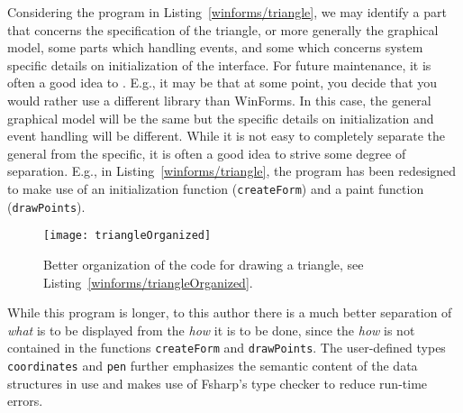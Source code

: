 Considering the program in Listing~\ref{winforms/triangle}, we may identify a part that concerns the specification of the triangle, or more generally the graphical model, some parts which handling events, and some which concerns system specific details on initialization of the interface. For future maintenance, it is often a good idea to . E.g., it may be that at some point, you decide that you would rather use a different library than WinForms. In this case, the general graphical model will be the same but the specific details on initialization and event handling will be different. While it is not easy to completely separate the general from the specific, it is often a good idea to strive some degree of separation. E.g., in Listing~\ref{winforms/triangle}, the program has been redesigned to make use of an initialization function (\lstinline{createForm}) and a paint function (\lstinline{drawPoints}).
%
%
\begin{figure}
  \centering
  \texttt{[image: triangleOrganized]}
  \caption{Better organization of the code for drawing a triangle, see Listing~\ref{winforms/triangleOrganized}.}
  \label{fig:triangleOrganized}
\end{figure}
While this program is longer, to this author there is a much better separation of {\em what} is to be displayed from the {\em how} it is to be done, since the {\em how} is not contained in the functions \lstinline!createForm! and \lstinline!drawPoints!. The user-defined types \lstinline!coordinates! and \lstinline!pen! further emphasizes the semantic content of the data structures in use and makes use of Fsharp's type checker to reduce run-time errors.

